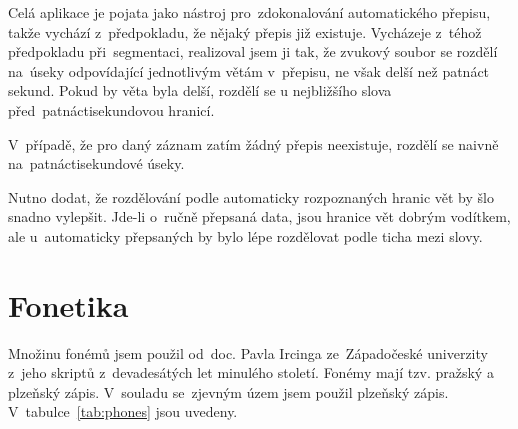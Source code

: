 Celá aplikace je pojata jako nástroj pro~zdokonalování automatického přepisu,
takže vychází z~předpokladu, že nějaký přepis již existuje. Vycházeje z~téhož
předpokladu při~segmentaci, realizoval jsem ji tak, že zvukový soubor se rozdělí
na~úseky odpovídající jednotlivým větám v~přepisu, ne však delší než patnáct
sekund. Pokud by věta byla delší, rozdělí se u nejbližšího slova
před~patnáctisekundovou hranicí.

V~případě, že pro daný záznam zatím žádný přepis neexistuje, rozdělí se naivně
na~patnáctisekundové úseky.

Nutno dodat, že rozdělování podle automaticky rozpoznaných hranic vět by šlo
snadno vylepšit. Jde-li o~ručně přepsaná data, jsou hranice vět dobrým vodítkem,
ale u~automaticky přepsaných by bylo lépe rozdělovat podle ticha mezi slovy.

\section{Fonetika}
\label{sec:ac:fonetika}

Množinu fonémů jsem použil od~doc. Pavla Ircinga ze~Západočeské univerzity
z~jeho skriptů z~devadesátých let minulého století. Fonémy mají tzv. pražský a
plzeňský zápis. V~souladu se~zjevným územ jsem použil plzeňský zápis.
V~tabulce~\ref{tab:phones} jsou uvedeny.

